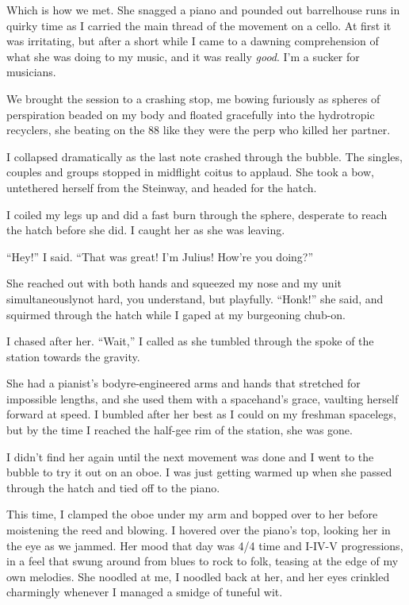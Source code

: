 Which is how we met. She snagged a piano and pounded out
barrelhouse runs in quirky time as I carried the main thread of the
movement on a cello. At first it was irritating, but after a short
while I came to a dawning comprehension of what she was doing to my
music, and it was really \emph{good}. I'm a sucker for musicians.

We brought the session to a crashing stop, me bowing furiously as
spheres of perspiration beaded on my body and floated gracefully
into the hydrotropic recyclers, she beating on the 88 like they
were the perp who killed her partner.

I collapsed dramatically as the last note crashed through the
bubble. The singles, couples and groups stopped in midflight coitus
to applaud. She took a bow, untethered herself from the Steinway,
and headed for the hatch.

I coiled my legs up and did a fast burn through the sphere,
desperate to reach the hatch before she did. I caught her as she
was leaving.

“Hey!” I said. “That was great! I'm Julius! How're you doing?”

She reached out with both hands and squeezed my nose and my unit
simultaneously{\dash}not hard, you understand, but playfully. “Honk!” she
said, and squirmed through the hatch while I gaped at my burgeoning
chub-on.

I chased after her. “Wait,” I called as she tumbled through the
spoke of the station towards the gravity.

She had a pianist's body{\dash}re-engineered arms and hands that
stretched for impossible lengths, and she used them with a
spacehand's grace, vaulting herself forward at speed. I bumbled
after her best as I could on my freshman spacelegs, but by the time
I reached the half-gee rim of the station, she was gone.

I didn't find her again until the next movement was done and I went
to the bubble to try it out on an oboe. I was just getting warmed
up when she passed through the hatch and tied off to the piano.

This time, I clamped the oboe under my arm and bopped over to her
before moistening the reed and blowing. I hovered over the piano's
top, looking her in the eye as we jammed. Her mood that day was 4/4
time and I-IV-V progressions, in a feel that swung around from
blues to rock to folk, teasing at the edge of my own melodies. She
noodled at me, I noodled back at her, and her eyes crinkled
charmingly whenever I managed a smidge of tuneful wit.

